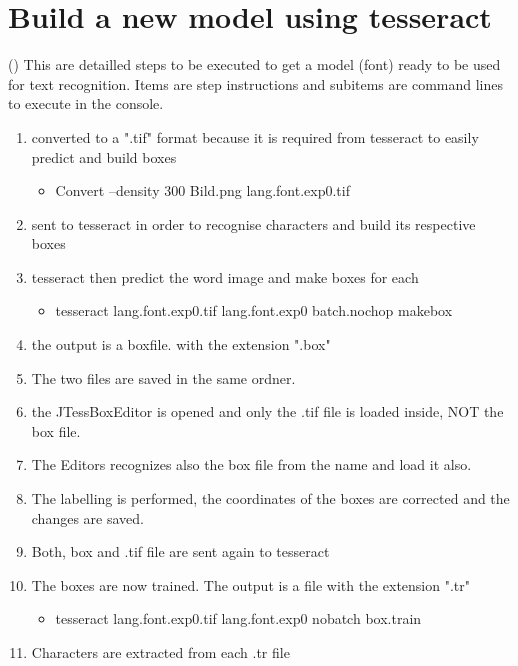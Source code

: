 \author{Bautrelle Fotso}
\graphicspath{ {./src/chapters/developer/media/} }

\chapter{Build a new model using tesseract} (\cite{[11]})
This are detailled steps to be executed to get a model (font) ready to be used for text recognition.
Items are step instructions and subitems are command lines to execute in the console.

\begin{enumerate}
	\item converted to a ".tif" format because it is required from tesseract to easily predict and build boxes
	\begin{itemize}
	  \item Convert –density 300 Bild.png lang.font.exp0.tif
	\end{itemize}
	\item sent to tesseract in order to recognise characters and build its respective boxes
	\item tesseract then predict the word image and make boxes for each
	\begin{itemize}
		\item tesseract lang.font.exp0.tif lang.font.exp0 batch.nochop makebox
	  \end{itemize}
	\item the output is a boxfile. with the extension ".box"
	\item The two files are saved in the same ordner.
	\item the JTessBoxEditor is opened and only the .tif file is loaded inside, NOT the box file. 
	\item The Editors recognizes also the box file from the name and load it also.  
	\item The labelling is performed, the coordinates of the boxes are corrected and the changes are saved.
	\item Both, box and .tif file are sent again to tesseract 
	\item The boxes are now trained. The output is a file with the extension ".tr"
	\begin{itemize}
		\item tesseract lang.font.exp0.tif lang.font.exp0 nobatch box.train
	  \end{itemize}
	\item Characters are extracted from each .tr file 
	\begin{itemize}

\end{itemize}
\end{enumerate}
